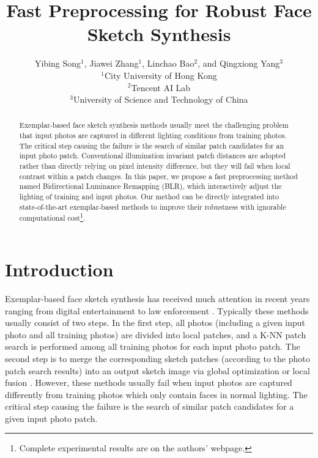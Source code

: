 \documentclass{article}
\title{Fast Preprocessing for Robust Face Sketch Synthesis}
\author{Yibing Song$^1$, Jiawei Zhang$^1$, Linchao Bao$^2$, and Qingxiong Yang$^3$\\
$^1$City University of Hong Kong\\
$^2$Tencent AI Lab\\
$^3$University of Science and Technology of China\\}
\begin{document}
\maketitle

\begin{abstract}
Exemplar-based face sketch synthesis methods usually meet the challenging problem that input photos are captured in different lighting conditions from training photos. The critical step causing the failure is the search of similar patch candidates for an input photo patch. Conventional illumination invariant patch distances are adopted rather than directly relying on pixel intensity difference, but they will fail when local contrast within a patch changes. In this paper, we propose a fast preprocessing method named Bidirectional Luminance Remapping (BLR), which interactively adjust the lighting of training and input photos. Our method can be directly integrated into state-of-the-art exemplar-based methods to improve their robustness with ignorable computational cost\footnote{Complete experimental results are on the authors' webpage.}.
\end{abstract}

\section{Introduction}

Exemplar-based face sketch synthesis has received much attention in recent years ranging from digital entertainment to law enforcement \cite{liu-ijcai07-bayesian,wang-cvpr12-semi,wang-ijcv14-survey,zhang-tip15-face,Peng-eccv16-lighting,peng-pami16-graphical,wang-tip17-bayesian}.
Typically these methods usually consist of two steps. In the first step, all photos (including a given input photo and all training photos) are divided into local patches, and a K-NN patch search is performed among all training photos for each input photo patch. The second step is to merge the corresponding sketch patches (according to the photo patch search results) into an output sketch image via global optimization \cite{wang-pami2009-face,wei-eccv10-lighting,hao-cvpr12-mwf,wang-nnls13-transductive,zhang-csvt15-face} or local fusion \cite{song-eccv14-sketch}. However, these methods usually fail when input photos are captured differently from training photos which only contain faces in normal lighting. The critical step causing the failure is the search of similar patch candidates for a given input photo patch.
\end{document}
